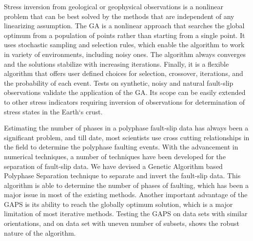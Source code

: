 \onehalfspacing
Stress inversion from geological or geophysical observations is a nonlinear problem that can be best solved by the methods that are independent of any linearizing assumption. The GA is a nonlinear approach that searches the global optimum from a population of points rather than starting from a single point. It uses stochastic sampling and selection rules, which enable the algorithm to work in variety of environments, including noisy ones. The algorithm always converges and the solutions stabilize with increasing iterations. Finally, it is a flexible algorithm that offers user defined choices for selection, crossover, iterations, and the probability of each event. Tests on synthetic, noisy and natural fault-slip observations validate the application of the GA. Its scope can be easily extended to other stress indicators requiring inversion of observations for determination of stress states in the Earth`s crust.

Estimating the number of phases in a polyphase fault-slip data has always been a significant problem, and till date, most scientists use cross cutting relationships in the field to determine the polyphase faulting events. With the advancement in numerical techniques, a number of techniques have been developed for the separation of fault-slip data. We have devised a Genetic Algorithm based Polyphase Separation technique to separate and invert the fault-slip data. This algorithm is able to determine the number of phases of faulting, which has been a major issue in most of the existing methods. Another important advantage of the GAPS is its ability to reach the globally optimum solution, which is a major limitation of most iterative methods. Testing the GAPS on data sets with similar orientations, and on data set with uneven number of subsets, shows the robust nature of the algorithm.